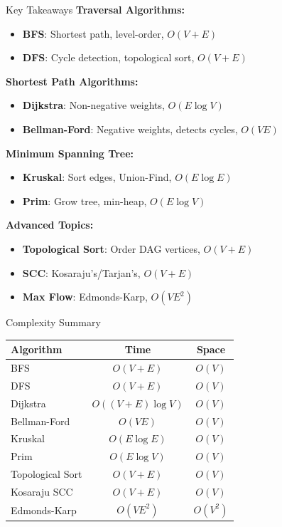 \documentclass[aspectratio=169]{beamer}
\begin{document}
\begin{frame}{Key Takeaways}
  \textbf{Traversal Algorithms:}
  \begin{itemize}
    \item \textbf{BFS}: Shortest path, level-order, $O(V + E)$
    \item \textbf{DFS}: Cycle detection, topological sort, $O(V + E)$
  \end{itemize}

  \vspace{0.3cm}
  \textbf{Shortest Path Algorithms:}
  \begin{itemize}
    \item \textbf{Dijkstra}: Non-negative weights, $O(E \log V)$
    \item \textbf{Bellman-Ford}: Negative weights, detects cycles, $O(VE)$
  \end{itemize}

  \vspace{0.3cm}
  \textbf{Minimum Spanning Tree:}
  \begin{itemize}
    \item \textbf{Kruskal}: Sort edges, Union-Find, $O(E \log E)$
    \item \textbf{Prim}: Grow tree, min-heap, $O(E \log V)$
  \end{itemize}

  \vspace{0.3cm}
  \textbf{Advanced Topics:}
  \begin{itemize}
    \item \textbf{Topological Sort}: Order DAG vertices, $O(V + E)$
    \item \textbf{SCC}: Kosaraju's/Tarjan's, $O(V + E)$
    \item \textbf{Max Flow}: Edmonds-Karp, $O(VE^2)$
  \end{itemize}
\end{frame}

\begin{frame}{Complexity Summary}
  \begin{center}
  \begin{tabular}{|l|c|c|}
    \hline
    \textbf{Algorithm} & \textbf{Time} & \textbf{Space} \\
    \hline
    BFS & $O(V + E)$ & $O(V)$ \\
    \hline
    DFS & $O(V + E)$ & $O(V)$ \\
    \hline
    Dijkstra & $O((V+E) \log V)$ & $O(V)$ \\
    \hline
    Bellman-Ford & $O(VE)$ & $O(V)$ \\
    \hline
    Kruskal & $O(E \log E)$ & $O(V)$ \\
    \hline
    Prim & $O(E \log V)$ & $O(V)$ \\
    \hline
    Topological Sort & $O(V + E)$ & $O(V)$ \\
    \hline
    Kosaraju SCC & $O(V + E)$ & $O(V)$ \\
    \hline
    Edmonds-Karp & $O(VE^2)$ & $O(V^2)$ \\
    \hline
  \end{tabular}
  \end{center}
\end{frame}
\end{document}
